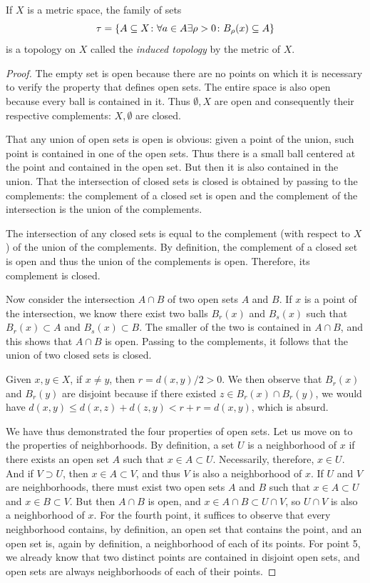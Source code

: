 \begin{theorem}
If $X$ is a metric space, the family of sets
\[
  \tau = {\left\{ A \subseteq X \colon \forall a \in A \exists \rho>0 \colon B_\rho(x) \subseteq A \right\}}
\]
is a topology on $X$ called the \emph{induced topology}
by the metric of $X$.
\end{theorem}

\begin{proof}
The empty set is open because there are no points on which it is necessary to
verify the property that defines open sets. The entire space is also open
because every ball is contained in it. Thus $\emptyset, X$ are open and
consequently their respective complements: $X, \emptyset$ are closed.

That any union of open sets is open is obvious: given a point of the union, such
point is contained in one of the open sets. Thus there is a small ball centered
at the point and contained in the open set. But then it is also contained in the
union.
That the intersection of closed sets is closed is obtained by passing to the
complements: the complement of a closed set is open and the complement of the
intersection is the union of the complements.

The intersection of any closed sets is equal to the complement (with respect to
$X$) of the union of the complements. By definition, the complement of a closed
set is open and thus the union of the complements is open. Therefore, its
complement is closed.

Now consider the intersection $A\cap B$ of two open sets $A$ and $B$. If $x$ is
a point of the intersection, we know there exist two balls $B_r(x)$ and $B_s(x)$
such that $B_r(x)\subset A$ and $B_s(x) \subset B$. The smaller of the two is
contained in $A\cap B$, and this shows that $A\cap B$ is open. Passing to the
complements, it follows that the union of two closed sets is closed.

Given $x,y \in X$, if $x\neq y$, then $r=d(x,y)/2>0$. We then observe that
$B_r(x)$ and $B_r(y)$ are disjoint because if there existed $z\in B_r(x) \cap
B_r(y)$, we would have $d(x,y)\le d(x,z) + d(z,y) < r + r = d(x,y)$, which is
absurd.

We have thus demonstrated the four properties of open sets. Let us move on to
the properties of neighborhoods. By definition, a set $U$ is a neighborhood of
$x$ if there exists an open set $A$ such that $x\in A \subset U$. Necessarily,
therefore, $x\in U$. And if $V\supset U$, then $x\in A \subset V$, and thus $V$
is also a neighborhood of $x$. If $U$ and $V$ are neighborhoods, there must
exist two open sets $A$ and $B$ such that $x\in A \subset U$ and $x \in B
\subset V$. But then $A\cap B$ is open, and $x \in A \cap B \subset U \cap V$,
so $U\cap V$ is also a neighborhood of $x$. For the fourth point, it suffices to
observe that every neighborhood contains, by definition, an open set that
contains the point, and an open set is, again by definition, a neighborhood of
each of its points. For point 5, we already know that two distinct points are
contained in disjoint open sets, and open sets are always neighborhoods of each
of their points.


\end{proof}
